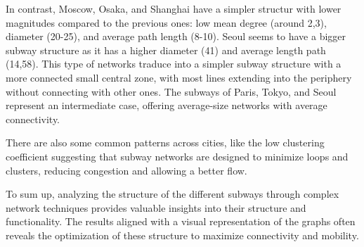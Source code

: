 In contrast, Moscow, Osaka, and Shanghai have a simpler structur with lower magnitudes compared to the previous ones: low mean degree (around 2,3), diameter (20-25), and average path length (8-10). Seoul seems to have a bigger subway structure as it has a higher diameter (41) and average length path (14,58). This type of networks traduce into a simpler subway structure with a more connected small central zone, with most lines extending into the periphery without connecting with other ones. The subways of Paris, Tokyo, and Seoul represent an intermediate case, offering average-size networks with average connectivity.


There are also some common patterns across cities, like the low clustering coefficient suggesting that subway networks are designed to minimize loops and clusters, reducing congestion and allowing a better flow.


To sum up, analyzing the structure of the different subways through complex network techniques provides valuable insights into their structure and functionality. The results aligned with a visual representation of the graphs often reveals the optimization of these structure to maximize connectivity and mobility.










\newpage
